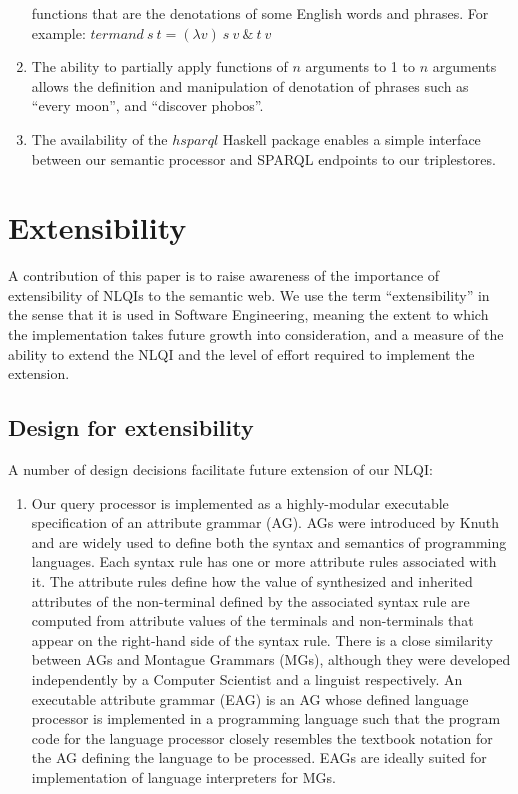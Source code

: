 \documentclass[../main.tex]{subfiles}
\begin{document}
\begin{refsection}
\begin{enumerate}
	functions that are the denotations of some English words and phrases. For example: $ \mathit{termand}\ s\ t = (\lambda v)\ s\ v\ \&\ t\ v  $
	\item The ability to partially apply functions of $n$ arguments to 1 to $n$ arguments allows the
	definition and manipulation of denotation of phrases such as ``every moon'', and ``discover
	phobos''.
	\item The availability of the $\mathit{hsparql}$ \cite{hsparql} Haskell package enables a simple interface between our
	semantic processor and SPARQL endpoints to our triplestores.
\end{enumerate}

\section{Extensibility}
\label{ext:extensible}

A contribution of this paper is to raise awareness of the importance of extensibility of NLQIs to
the semantic web. We use the term ``extensibility'' in the sense that it is used in Software Engineering,
meaning the extent to which the implementation takes future growth into consideration, and a
measure of the ability to extend the NLQI and the level of effort required to implement the extension.


\subsection{Design for extensibility}

A number of design decisions facilitate future extension of our NLQI:

\begin{enumerate}
	\item Our query processor is implemented as a highly-modular executable specification of an attribute grammar (AG). AGs were introduced by Knuth \cite{knuth1968semantics} and are
	widely used to define both the syntax and semantics of programming languages. Each syntax
	rule has one or more attribute rules associated with it. The attribute rules define how the value
	of synthesized and inherited attributes of the non-terminal defined by the
	associated syntax rule are computed from attribute values of the terminals and non-terminals
	that appear on the right-hand side of the syntax rule. There is a close similarity between AGs
	and Montague Grammars (MGs), although they were developed independently by a Computer
	Scientist and a linguist respectively. An executable attribute grammar (EAG) is an AG whose
	defined language processor is implemented in a programming language such that the program
	code for the language processor closely resembles the textbook notation for the AG defining
	the language to be processed. EAGs are ideally suited for
	implementation of language interpreters for MGs.


\end{enumerate}
\end{refsection}
\end{document}

